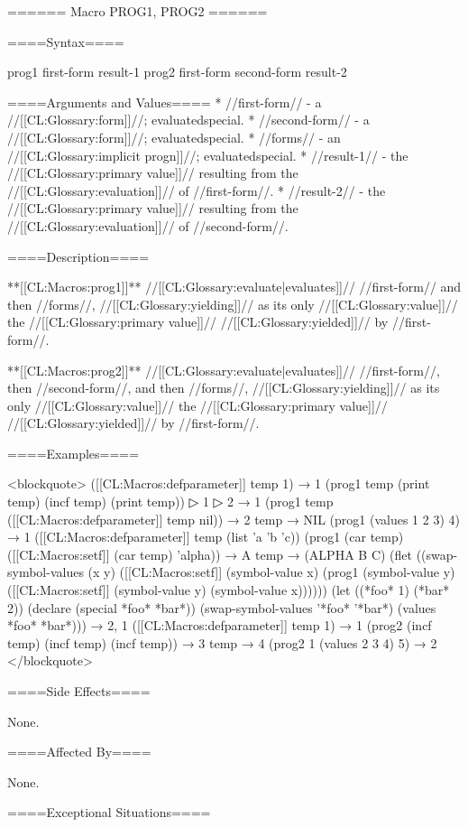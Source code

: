 ====== Macro PROG1, PROG2 ======

====Syntax====

\DefmacWithValues prog1 {first-form } {result-1} \DefmacWithValues prog2 {first-form second-form } {result-2}

====Arguments and Values====
  * //first-form// - a //[[CL:Glossary:form]]//; evaluatedspecial.
  * //second-form// - a //[[CL:Glossary:form]]//; evaluatedspecial.
  * //forms// - an //[[CL:Glossary:implicit progn]]//; evaluatedspecial.
  * //result-1// - the //[[CL:Glossary:primary value]]// resulting from the //[[CL:Glossary:evaluation]]// of //first-form//.
  * //result-2// - the //[[CL:Glossary:primary value]]// resulting from the //[[CL:Glossary:evaluation]]// of //second-form//.

====Description====

**[[CL:Macros:prog1]]** //[[CL:Glossary:evaluate|evaluates]]// //first-form// and then //forms//, //[[CL:Glossary:yielding]]// as its only //[[CL:Glossary:value]]// the //[[CL:Glossary:primary value]]// //[[CL:Glossary:yielded]]// by //first-form//.

**[[CL:Macros:prog2]]** //[[CL:Glossary:evaluate|evaluates]]// //first-form//, then //second-form//, and then //forms//, //[[CL:Glossary:yielding]]// as its only //[[CL:Glossary:value]]// the //[[CL:Glossary:primary value]]// //[[CL:Glossary:yielded]]// by //first-form//.

====Examples====

<blockquote> ([[CL:Macros:defparameter]] temp 1) → 1 (prog1 temp (print temp) (incf temp) (print temp))
▷ 1
▷ 2 → 1 (prog1 temp ([[CL:Macros:defparameter]] temp nil)) → 2 temp → NIL (prog1 (values 1 2 3) 4) → 1 ([[CL:Macros:defparameter]] temp (list 'a 'b 'c)) (prog1 (car temp) ([[CL:Macros:setf]] (car temp) 'alpha)) → A temp → (ALPHA B C) (flet ((swap-symbol-values (x y) ([[CL:Macros:setf]] (symbol-value x) (prog1 (symbol-value y) ([[CL:Macros:setf]] (symbol-value y) (symbol-value x)))))) (let ((*foo* 1) (*bar* 2)) (declare (special *foo* *bar*)) (swap-symbol-values '*foo* '*bar*) (values *foo* *bar*))) → 2, 1 ([[CL:Macros:defparameter]] temp 1) → 1 (prog2 (incf temp) (incf temp) (incf temp)) → 3 temp → 4 (prog2 1 (values 2 3 4) 5) → 2 </blockquote>

====Side Effects====

None.

====Affected By====

None.

====Exceptional Situations====

